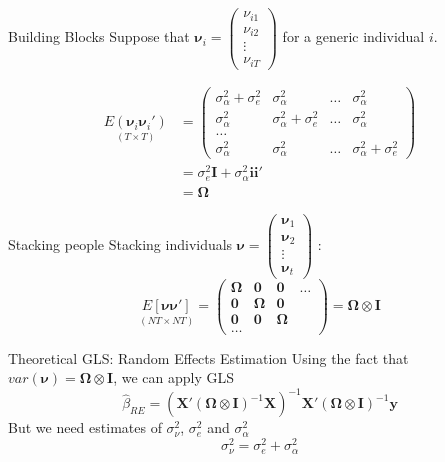 \documentclass[aspectratio=169, handout, t]{beamer}
\numberwithin{equation}{section}
\begin{document}
\begin{frame}{Building Blocks}
Suppose that $\bm{\nu}_i=\begin{pmatrix}\nu_{i1}\\\nu_{i2}\\ \vdots\\ \nu_{iT}\end{pmatrix}$ for a generic individual $i$.

\begin{align*}
\underset{(T\times T)}{E(\bm{\nu}_i\bm{\nu}_i')}&=\begin{pmatrix} \sigma_\alpha^2+\sigma_e^2&\sigma^2_\alpha& \ldots &\sigma^2_\alpha\\
 \sigma_\alpha^2& \sigma_\alpha^2+\sigma_e^2& \ldots& \sigma^2_\alpha\\
 \ldots\\
 \sigma^2_\alpha& \sigma^2_\alpha& \ldots& \sigma_\alpha^2+\sigma_e^2\end{pmatrix}\\
 &= \sigma_e^2 \bm{I}+\sigma_\alpha^2\bm{i}\bm{i}'\\
 &=\bm{\Omega}
 \end{align*}
\end{frame}

\begin{frame}{Stacking people}
 Stacking individuals $\bm{\nu}=\begin{pmatrix}\bm{\nu}_{1}\\\bm{\nu}_{2}\\ \vdots\\\bm{\nu}_{t}\end{pmatrix}$ :
 $$\underset{(NT\times NT)}{E[ \bm{\nu}\bm{\nu}']}=\begin{pmatrix}\bm{\Omega}&\bm{0}&\bm{0}&\ldots\\ \bm{0}&\bm{\Omega}&\bm{0}\\ \bm{0}& \bm{0}&\bm{\Omega}&\\ \ldots \end{pmatrix}=\bm{\Omega}\otimes\bm{I}$$
\end{frame}





\begin{frame}{Theoretical GLS: Random Effects Estimation}
Using the fact that $var(\bm{\nu})=\bm{\Omega}\otimes\bm{I}$, we can apply GLS
$$\hat{\beta}_{RE}=(\bm{X}'(\bm{\Omega}\otimes\bm{I})^{-1}\bm{X})^{-1}\bm{X}'(\bm{\Omega}\otimes\bm{I})^{-1}\bm{y}$$
But we need estimates of  $\sigma^2_\nu$, $\sigma_e^2$ and $\sigma_\alpha^2$
$$\sigma^2_\nu=\sigma_e^2+\sigma_\alpha^2$$
\end{frame}
\end{document}
